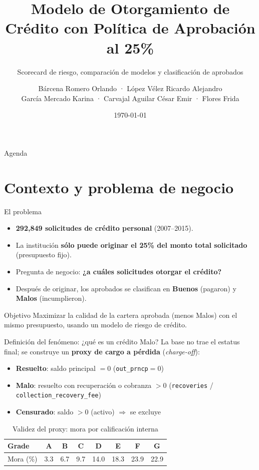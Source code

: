 \documentclass[aspectratio=169, 11pt]{beamer}
\title[Modelo de Otorgamiento de Crédito al 25\%]
      {Modelo de Otorgamiento de Crédito con Política de Aprobación al 25\%}
\subtitle{Scorecard de riesgo, comparación de modelos y clasificación de aprobados}
\author[Bárcena \& equipo]{Bárcena Romero Orlando · López Vélez Ricardo Alejandro\\
       García Mercado Karina · Carvajal Aguilar César Emir · Flores Frida}
\institute[FES Acatlán, UNAM]{Licenciatura en Actuaría · FES Acatlán, UNAM\\
       Administración Actuarial · Semestre 2026-1}
\date{\today}
\newcommand{\bt}[1]{\textbf{#1}}
\begin{document}
\begin{frame}[plain]
  \titlepage
\end{frame}

\begin{frame}{Agenda}
  \tableofcontents
\end{frame}

\section{Contexto y problema de negocio}

\begin{frame}{El problema}
  \begin{itemize}
    \item \bt{292,849 solicitudes de crédito personal} (2007--2015).
    \item La institución \bt{sólo puede originar el 25\% del monto total
          solicitado} (presupuesto fijo).
    \item Pregunta de negocio: \bt{¿a cuáles solicitudes otorgar el crédito?}
    \item Después de originar, los aprobados se clasifican en
          \bt{Buenos} (pagaron) y \bt{Malos} (incumplieron).
  \end{itemize}

  \begin{alertblock}{Objetivo}
    Maximizar la calidad de la cartera aprobada (menos Malos) con el mismo
    presupuesto, usando un modelo de riesgo de crédito.
  \end{alertblock}
\end{frame}

\begin{frame}{Definición del fenómeno: ¿qué es un crédito Malo?}
  La base no trae el estatus final; se construye un \bt{proxy de cargo a
  pérdida} (\emph{charge-off}):

  \begin{itemize}
    \item \bt{Resuelto}: saldo principal $= 0$ (\texttt{out\_prncp}$=0$)
    \item \bt{Malo}: resuelto con recuperación o cobranza $>0$
          (\texttt{recoveries} / \texttt{collection\_recovery\_fee})
    \item \bt{Censurado}: saldo $>0$ (activo) $\Rightarrow$ se excluye
  \end{itemize}

  \begin{table}
    \small
    \caption*{Validez del proxy: mora por calificación interna}
    \begin{tabular}{lccccccc}
      \toprule
      Grade & A & B & C & D & E & F & G \\
      \midrule
      Mora (\%) & 3.3 & 6.7 & 9.7 & 14.0 & 18.3 & 23.9 & 22.9 \\
      \bottomrule
    \end{tabular}
  \end{table}
\end{frame}
\end{document}

